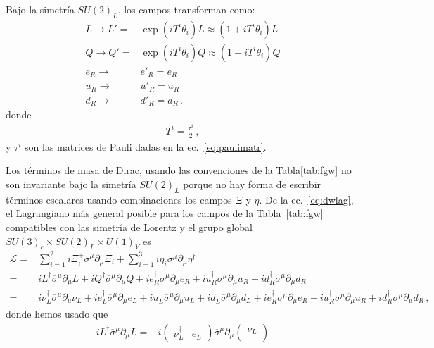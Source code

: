 \begin{frame}
Bajo la simetría $SU(2)_L$, los campos transforman como:
 \begin{align}
  L\to L'=&\exp(i T^i \theta_i)L\approx(1+i T^i\theta_i)L\nonumber\\
  Q\to Q'=&\exp(i T^i \theta_i)Q\approx(1+i T^i\theta_i)Q\nonumber\\
  e_R\to& e'_R=e_R\nonumber\\
  u_R\to& u'_R=u_R\nonumber\\
  d_R\to& d'_R=d_R\,.
\end{align}
donde
\begin{align}
  T^i=\frac{\tau^i}{2}\,,
\end{align}
y $\tau^i$ son las matrices de Pauli dadas en la ec.~\eqref{eq:paulimatr}.

Los términos de masa de Dirac, usando las convenciones de la
Tabla\ref{tab:fgw} no son invariante bajo la simetría $SU(2)_L$ porque
no hay forma de escribir términos escalares usando combinaciones los
campos $\Xi$ y $\eta$. De la ec.~\eqref{eq:dwlag}, el Lagrangiano más
general posible para los campos de la Tabla~\ref{tab:fgw} compatibles
con las simetría de Lorentz y el grupo global $SU(3)_c\times
SU(2)_L\times U(1)_Y$ es
\begin{align}
  \mathcal{L}=&\sum_{i=1}^2i\Xi_i^+\overline{\sigma}^{\mu}\partial_{\mu}\Xi_i
+\sum_{i=1}^3i\eta_{i}\sigma^{\mu}\partial_{\mu} \eta^{\dagger}\nonumber\\
=&iL^{\dagger}\overline{\sigma}^{\mu}\partial_{\mu}L+iQ^{\dagger}\overline{\sigma}^{\mu}\partial_{\mu}Q
+ie_R^{\dagger}\sigma^{\mu}\partial_{\mu} e_R+iu_R^{\dagger}\sigma^{\mu}\partial_{\mu} u_R+i
d_R^{\dagger}\sigma^{\mu}\partial_{\mu} d_R \nonumber\\
=&i\nu_L^{\dagger}\overline{\sigma}^{\mu}\partial_{\mu}\nu_L+i
e_L^{\dagger}\overline{\sigma}^{\mu}\partial_{\mu}e_L+i
u_L^{\dagger}\overline{\sigma}^{\mu}\partial_{\mu}u_L+i
d_L^{\dagger}\overline{\sigma}^{\mu}\partial_{\mu}d_L
+ie_R^{\dagger}\sigma^{\mu}\partial_{\mu} e_R+iu_R^{\dagger}\sigma^{\mu}\partial_{\mu} u_R+i
d_R^{\dagger}\sigma^{\mu}\partial_{\mu} d_R \,,
\end{align}
donde hemos usado que
\begin{align*}
  iL^{\dagger}\overline{\sigma}^{\mu}\partial_{\mu}L=&
  i\begin{pmatrix}
    \nu_L^{\dagger} & e_L^{\dagger}
  \end{pmatrix}\overline{\sigma}^{\mu}\partial_{\mu}
    \begin{pmatrix}
      \nu_L\\

\end{pmatrix}
\end{align*}
\end{frame}
